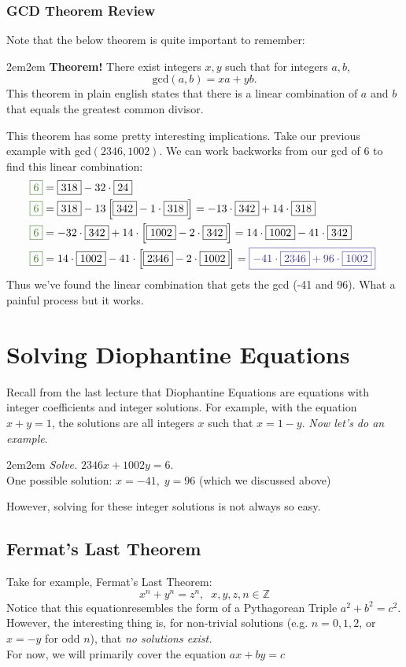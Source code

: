 \documentclass[10pt,oneside]{book}
\newcommand{\Z}{\mathbb{Z}}\newcommand{\R}{\mathbb{R}}\newcommand{\N}{\mathbb{N}}
\newcommand{\gspc}{\vspace{0.13cm}} %
\newcommand{\gline}{\gspc\\} %
\begin{document}
\subsubsection*{GCD Theorem Review}
Note that the below theorem is quite important to remember:
\begin{adjustwidth}{2em}{2em}\gspc
	\textbf{Theorem!} There exist integers $x,y$ such that for integers $a,b$,
	\[\text{gcd}(a,b)=xa+yb.\]
	This theorem in plain english states that there is a linear combination of $a$ and $b$ that equals the greatest common divisor. \gspc
\end{adjustwidth}
This theorem has some pretty interesting implications. Take our previous example with gcd$(2346, 1002)$. We can work backworks from our gcd of 6 to find this linear combination:
\begin{align*}
	\cg {\fbox{6}} &= \fbox{318} - 32\cdot\fbox{24}\\
	\cg{\fbox{6}} &= \fbox{318} - 13\left[\fbox{342} - 1\cdot \fbox{318}\right] = -13\cdot\fbox{342} + 14\cdot \fbox{318}\\
	\cg{\fbox{6}} &= -32\cdot\fbox{342}+14\cdot\left[\fbox{1002}-2\cdot\fbox{342}\right]=14\cdot\fbox{1002}-41\cdot\fbox{342}\\
	\cg{\fbox{6}}&=14\cdot\fbox{1002}-41\cdot\left[\fbox{2346}-2\cdot\fbox{1002}\right]=\cb{\boxed{-41\cdot\fbox{2346}+96\cdot\fbox{1002}}}.
\end{align*}
Thus we've found the linear combination that gets the gcd (-41 and 96). What a painful process but it works. 
\pagebreak
\section*{Solving Diophantine Equations}
Recall from the last lecture that Diophantine Equations are equations with integer coefficients and integer solutions. For example, with the equation $x + y =1$, the solutions are all integers $x$ such that $x = 1 -y$. \textit{Now let's do an example}. 
\begin{adjustwidth}{2em}{2em}\gspc
	\textit{Solve.} $2346x + 1002y = 6$.\gline
	One possible solution: $x = -41, \;y=96$ (which we discussed above)
\end{adjustwidth}
However, solving for these integer solutions is not always so easy.
\subsection*{Fermat's Last Theorem}
Take for example, Fermat's Last Theorem:
\[x^n+y^n = z^n,\;\;x,y,z,n\in\Z\]
Notice that this equationresembles the form of a Pythagorean Triple $a^2 + b^2 = c^2$. However, the interesting thing is, for non-trivial solutions (e.g. $n = 0, 1, 2$, or $x = -y$ for odd $n$), that \textit{no solutions exist.}\gline
For now, we will primarily cover the equation $ax+ by=c$
%
%
%
\end{document}

